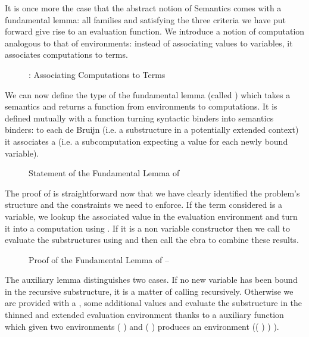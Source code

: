 

It is once more the case that the abstract notion of Semantics comes with a
fundamental lemma: all   families  and  satisfying
the three criteria we have put forward give rise to an evaluation function.
We introduce a notion of computation  analogous to that of environments:
instead of associating values to variables, it associates computations to terms.

\begin{figure}[h]
\caption{: Associating Computations to Terms}
\end{figure}

We can now define the type of the fundamental lemma (called ) which
takes a semantics and returns a function from environments to computations. It is
defined mutually with a function  turning syntactic binders into
semantics binders: to each de Bruijn  (i.e. a substructure in a potentially
extended context) it associates a  (i.e. a subcomputation expecting a
value for each newly bound variable).

\begin{figure}[h]
\caption{Statement of the Fundamental Lemma of }
\end{figure}

The proof of  is straightforward now that we have clearly identified the
problem's structure and the constraints we need to enforce. If the term considered
is a variable, we lookup the associated value in the evaluation environment and
turn it into a computation using . If it is a non variable constructor
then we call  to evaluate the substructures using  and then
call the ebra to combine these results.

\begin{figure}[h]
\caption{Proof of the Fundamental Lemma of  -- }
\end{figure}

The auxiliary lemma  distinguishes two cases. If no new variable has
been bound in the recursive substructure, it is a matter of calling 
recursively. Otherwise we are provided with a , some additional
values and evaluate the substructure in the thinned and extended evaluation
environment thanks to a auxiliary function \AF{\_>>\_} which given two
environments {( )  } and {( )  }
produces an environment {(( \AF{++} ) )  )}.

